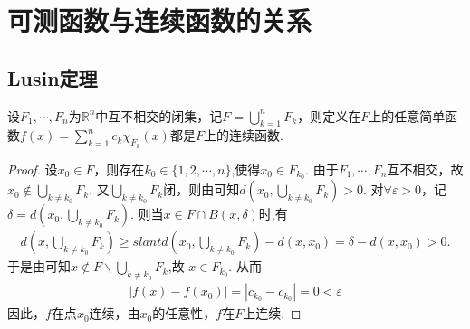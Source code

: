 \documentclass[../../main.tex]{subfiles}
\begin{document}
\section{可测函数与连续函数的关系}

\subsection{Lusin定理}

\begin{lemma}\label{lemma:简单函数在无交闭集连续则在这些闭集的并上也连续}
设\(F_1, \cdots, F_n\)为\(\mathbb{R}^n\)中互不相交的闭集，记\(F = \bigcup_{k = 1}^{n} F_k\)，则定义在$F$上的任意简单函数\(f(x) = \sum_{k = 1}^{n} c_k \chi_{F_k}(x)\)都是\(F\)上的连续函数.
\end{lemma}
\begin{proof}
设\(x_0 \in F\)，则存在\(k_0\in \{1,2,\cdots,n\}\),使得\(x_0 \in F_{k_0}\). 由于\(F_1, \cdots, F_n\)互不相交，故\(x_0 \notin \bigcup_{k \neq k_0} F_k\). 又\(\bigcup_{k \neq k_0} F_k\)闭，则由可知\(d(x_0, \bigcup_{k \neq k_0} F_k) > 0\). 对\(\forall \varepsilon > 0\)，记\(\delta = d(x_0, \bigcup_{k \neq k_0} F_k)\). 则当\(x \in F\cap B(x,\delta)\)时,有
\begin{align*}
d\left( x,\bigcup_{k\ne k_0}{F_k} \right) \geqslant slant d\left( x_0,\bigcup_{k\ne k_0}{F_k} \right) -d\left( x,x_0 \right) =\delta -d\left( x,x_0 \right) >0.
\end{align*}
于是由可知$x\notin F\backslash \bigcup_{k\ne k_0}{F_k}$,故
\(x \in F_{k_0}\). 从而
\begin{align*}
|f(x) - f(x_0)| = |c_{k_0} - c_{k_0}| = 0 < \varepsilon
\end{align*}
因此，\(f\)在点\(x_0\)连续，由\(x_0\)的任意性，\(f\)在\(F\)上连续. 
\end{proof}
\end{document}
